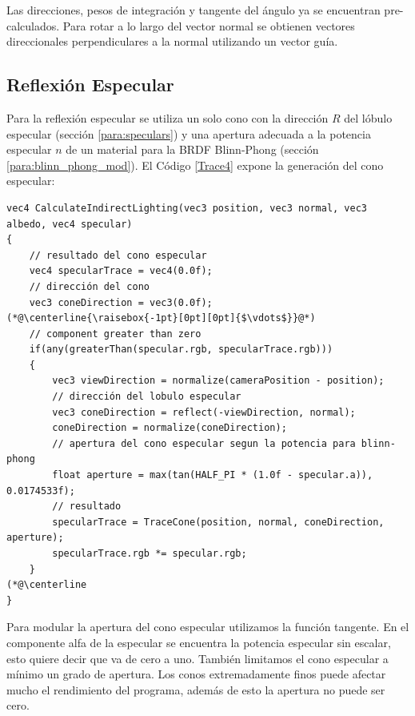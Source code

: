 Las direcciones, pesos de integración y tangente del ángulo ya se encuentran pre-calculados. Para rotar a lo largo del vector normal se obtienen vectores direccionales perpendiculares a la normal utilizando un vector guía.
\subsection{Reflexión Especular} %
\label{sub:reflexion_especular}
Para la reflexión especular se utiliza un solo cono con la dirección $R$ del lóbulo especular (sección \ref{para:speculars}) y una apertura adecuada a la potencia especular $n$ de un material para la \ac{BRDF} Blinn-Phong (sección \ref{para:blinn_phong_mod}). El Código \ref{Trace4} expone la generación del cono especular:
\\
\begin{lstlisting}[caption={Cono para reflexión especular.}, label=Trace4]
vec4 CalculateIndirectLighting(vec3 position, vec3 normal, vec3 albedo, vec4 specular)
{
    // resultado del cono especular
    vec4 specularTrace = vec4(0.0f);
    // dirección del cono
    vec3 coneDirection = vec3(0.0f);
(*@\centerline{\raisebox{-1pt}[0pt][0pt]{$\vdots$}}@*)
    // component greater than zero
    if(any(greaterThan(specular.rgb, specularTrace.rgb)))
    {
        vec3 viewDirection = normalize(cameraPosition - position);
        // dirección del lobulo especular
        vec3 coneDirection = reflect(-viewDirection, normal);
        coneDirection = normalize(coneDirection);
        // apertura del cono especular segun la potencia para blinn-phong
        float aperture = max(tan(HALF_PI * (1.0f - specular.a)), 0.0174533f);
        // resultado
        specularTrace = TraceCone(position, normal, coneDirection, aperture);
        specularTrace.rgb *= specular.rgb;
    }
(*@\centerline
}
\end{lstlisting}

Para modular la apertura del cono especular utilizamos la función tangente. En el componente alfa de la especular se encuentra la potencia especular sin escalar, esto quiere decir que va de cero a uno. También limitamos el cono especular a mínimo un grado de apertura. Los conos extremadamente finos puede afectar mucho el rendimiento del programa, además de esto la apertura no puede ser cero.
